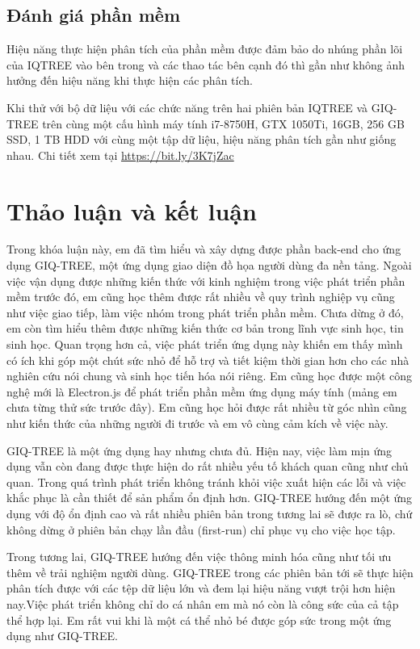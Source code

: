 \documentclass[12pt]{report}
\begin{document}
\section{Đánh giá phần mềm}
Hiệu năng thực hiện phân tích của phần mềm được đảm bảo do nhúng phần lõi của IQTREE vào bên trong và các thao tác bên cạnh đó thì gần như không ảnh hưởng đến hiệu năng khi thực hiện các phân tích.

Khi thử với bộ dữ liệu với các chức năng trên hai phiên bản IQTREE và GIQ-TREE trên cùng một cấu hình máy tính i7-8750H, GTX 1050Ti,  16GB, 256 GB SSD, 1 TB HDD với cùng một tập dữ liệu, hiệu năng phân tích gần như giống nhau. Chi tiết xem tại \url{https://bit.ly/3K7jZac}

\newpage	
\chapter{Thảo luận và kết luận}
\label{chap:chapter6}
Trong khóa luận này, em đã tìm hiểu và xây dựng được phần back-end cho ứng dụng GIQ-TREE, một ứng dụng giao diện đồ họa người dùng đa nền tảng. Ngoài việc vận dụng được những kiến thức với kinh nghiệm trong việc phát triển phần mềm trước đó, em cũng học thêm được rất nhiều về quy trình nghiệp vụ cũng như việc giao tiếp, làm việc nhóm trong phát triển phần mềm. Chưa dừng ở đó, em còn tìm hiểu thêm được những kiến thức cơ bản trong lĩnh vực sinh học, tin sinh học. Quan trọng hơn cả, việc phát triển ứng dụng này khiến em thấy mình có ích khi góp một chút sức nhỏ để hỗ trợ và tiết kiệm thời gian hơn cho các nhà nghiên cứu nói chung và sinh học tiến hóa nói riêng. Em cũng học được một công nghệ mới là Electron.js để phát triển phần mềm ứng dụng máy tính (mảng em chưa từng thử sức trước đây). Em cũng học hỏi được rất nhiều từ góc nhìn cũng như kiến thức của những người đi trước và em vô cùng cảm kích về việc này.

GIQ-TREE là một ứng dụng hay nhưng chưa đủ. Hiện nay, việc làm mịn ứng dụng vẫn còn đang được thực hiện do rất nhiều yếu tố khách quan cũng như chủ quan. Trong quá trình phát triển không tránh khỏi việc xuất hiện các lỗi và việc khắc phục là cần thiết để sản phẩm ổn định hơn. GIQ-TREE hướng đến một ứng dụng với độ ổn định cao và rất nhiều phiên bản trong tương lai sẽ được ra lò, chứ không dừng ở phiên bản chạy lần đầu (first-run) chỉ phục vụ cho việc học tập.

Trong tương lai, GIQ-TREE hướng đến việc thông minh hóa cũng như tối ưu thêm về trải nghiệm người dùng. GIQ-TREE trong các phiên bản tới sẽ thực hiện phân tích được với các tệp dữ liệu lớn và đem lại hiệu năng vượt trội hơn hiện nay.Việc phát triển không chỉ do cá nhân em mà nó còn là công sức của cả tập thể hợp lại. Em rất vui khi là một cá thể nhỏ bé được góp sức trong một ứng dụng như GIQ-TREE.
\end{document}
